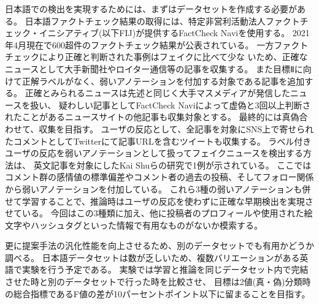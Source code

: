 \vspace{20pt}
日本語での検出を実現するためには、まずはデータセットを作成する必要がある。
日本語ファクトチェック結果の取得には、特定非営利活動法人ファクトチェック・イニシアティブ(以下FIJ)が提供するFactCheck Naviを使用する。
2021年4月現在で600超件のファクトチェック結果が公表されている。%
一方ファクトチェックにより正確と判断された事例はフェイクに比べて少な%
いため、正確なニュースとして大手新聞社やロイター通信等の記事を収集する。
また目標Ⅱに向けて正解ラベルがなく、弱いアノテーションを付加する対象である記事を追加する。
正確とみられるニュースは先述と同じく大手マスメディアが発信したニュースを扱い、
疑わしい記事としてFactCheck Naviによって虚偽と3回以上判断されたことがあるニュースサイトの他記事も収集対象とする。
最終的には真偽合わせて、収集を目指す。
ユーザの反応として、全記事を対象にSNS上で寄せられたコメントとしてTwitterにて記事URLを含むツイートも収集する。
ラベル付きユーザの反応を弱いアノテーションとして扱ってフェイクニュースを検出する方法は、
英文記事を対象にしたKai Shuらの研究で1例が示されている\cite{shu2020leveraging}。
ここではコメント群の感情値の標準偏差やコメント者の過去の投稿、そしてフォロー関係から弱いアノテーションを付加している。
これら3種の弱いアノテーションも併せて学習することで、推論時はユーザの反応を使わずに正確な早期検出を実現させている。
今回はこの3種類に加え、他に投稿者のプロフィールや使用された絵文字やハッシュタグといった情報で有用なものがないか模索する。

更に提案手法の汎化性能を向上させるため、別のデータセットでも有用かどうか調べる。
日本語データセットは数が乏しいため、複数バリエーションがある英語で実験を行う予定である。
実験では学習と推論を同じデータセット内で完結させた時と別のデータセットで行った時を比較させ、
目標は2値(真・偽)分類時の総合指標であるF値の差が10パーセントポイント以下に留まることを目指す。

